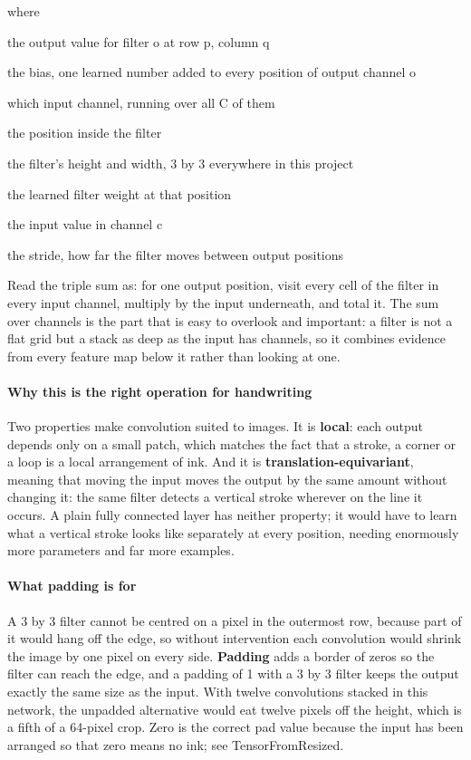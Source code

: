 \noindent where
\begin{description}[leftmargin=2.4em,style=nextline,font=\normalfont\ttfamily]\setlength\itemsep{1pt}
  \item[{$y[o,p,q]$}] \normalfont the output value for filter o at row p, column q
  \item[{$b[o]$}] \normalfont the bias, one learned number added to every position of output channel o
  \item[{$c$}] \normalfont which input channel, running over all C of them
  \item[{$u,\,v$}] \normalfont the position inside the filter
  \item[{$k_h,\,k_w$}] \normalfont the filter's height and width, 3 by 3 everywhere in this project
  \item[{$w[o,c,u,v]$}] \normalfont the learned filter weight at that position
  \item[{$x[c,\,y,\,x]$}] \normalfont the input value in channel c
  \item[{$s$}] \normalfont the stride, how far the filter moves between output positions
\end{description}
Read the triple sum as: for one output position, visit every cell of the filter in every input channel, multiply by the input underneath, and total it. The sum over channels is the part that is easy to overlook and important: a filter is not a flat grid but a stack as deep as the input has channels, so it combines evidence from every feature map below it rather than looking at one.


\paragraph{Why this is the right operation for handwriting}
Two properties make convolution suited to images. It is \textbf{local}: each output depends only on a small patch, which matches the fact that a stroke, a corner or a loop is a local arrangement of ink. And it is \textbf{translation-equivariant}, meaning that moving the input moves the output by the same amount without changing it: the same filter detects a vertical stroke wherever on the line it occurs. A plain fully connected layer has neither property; it would have to learn what a vertical stroke looks like separately at every position, needing enormously more parameters and far more examples.


\paragraph{What padding is for}
A 3 by 3 filter cannot be centred on a pixel in the outermost row, because part of it would hang off the edge, so without intervention each convolution would shrink the image by one pixel on every side. \textbf{Padding} adds a border of zeros so the filter can reach the edge, and a padding of 1 with a 3 by 3 filter keeps the output exactly the same size as the input. With twelve convolutions stacked in this network, the unpadded alternative would eat twelve pixels off the height, which is a fifth of a 64-pixel crop. Zero is the correct pad value because the input has been arranged so that zero means no ink; see TensorFromResized.


